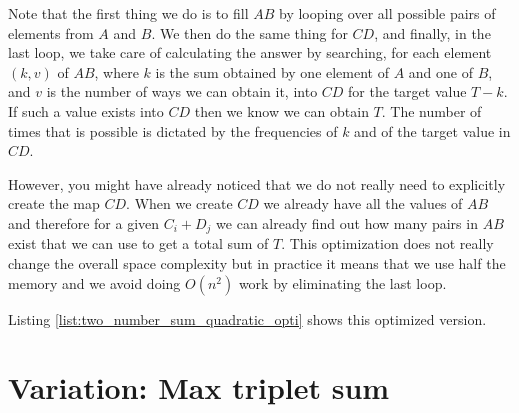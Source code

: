

Note that the first thing we do is to fill $AB$ by looping over all possible pairs of elements from $A$ and $B$.
We then do the same thing for $CD$, and finally, in the last loop, we take care of calculating the answer by searching, for each element $(k,v)$ of $AB$, where $k$ is the sum obtained by one element of $A$ and one of $B$, and $v$ is the number of ways we can obtain it,
into $CD$ for the target value $T-k$. If such a value exists into $CD$ then we know we can obtain $T$. The number of times
that is possible is dictated by the frequencies of $k$ and of the target value in $CD$.

However, you might have already noticed that we do not really need to explicitly create the map $CD$. 
When we create $CD$ we already have all the values of $AB$  and therefore for a given $C_i+D_j$ we can already find out how many pairs in $AB$ exist that we can use to get a total sum of $T$. 
This optimization does not really change the overall space complexity
but in practice it means that we use half the memory and we avoid doing $O(n^2)$ work by eliminating the last loop.

Listing \ref{list:two_number_sum_quadratic_opti} shows this optimized version.




%



\section*{Variation: Max triplet sum}
\label{ch:max_triplet}

